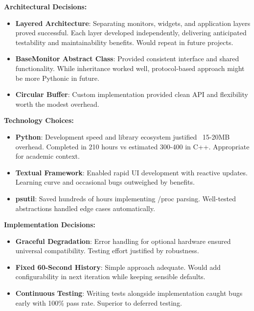 \documentclass[12pt,a4paper,oneside]{report}
\begin{document}
\textbf{Architectural Decisions:}
\begin{itemize}
    \item \textbf{Layered Architecture}: Separating monitors, widgets, and application layers proved successful. Each layer developed independently, delivering anticipated testability and maintainability benefits. Would repeat in future projects.
    
    \item \textbf{BaseMonitor Abstract Class}: Provided consistent interface and shared functionality. While inheritance worked well, protocol-based approach might be more Pythonic in future.
    
    \item \textbf{Circular Buffer}: Custom implementation provided clean API and flexibility worth the modest overhead.
\end{itemize}

\textbf{Technology Choices:}
\begin{itemize}
    \item \textbf{Python}: Development speed and library ecosystem justified ~15-20MB overhead. Completed in 210 hours vs estimated 300-400 in C++. Appropriate for academic context.
    
    \item \textbf{Textual Framework}: Enabled rapid UI development with reactive updates. Learning curve and occasional bugs outweighed by benefits.
    
    \item \textbf{psutil}: Saved hundreds of hours implementing /proc parsing. Well-tested abstractions handled edge cases automatically.
\end{itemize}

\textbf{Implementation Decisions:}
\begin{itemize}
    \item \textbf{Graceful Degradation}: Error handling for optional hardware ensured universal compatibility. Testing effort justified by robustness.
    
    \item \textbf{Fixed 60-Second History}: Simple approach adequate. Would add configurability in next iteration while keeping sensible defaults.
    
    \item \textbf{Continuous Testing}: Writing tests alongside implementation caught bugs early with 100\% pass rate. Superior to deferred testing.
\end{itemize}
\end{document}
